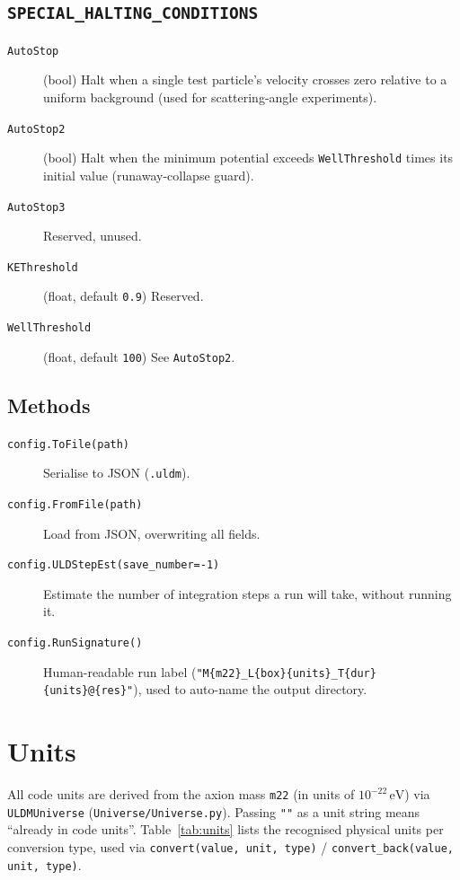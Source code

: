 \documentclass[11pt]{article}
\newcommand{\code}[1]{\texttt{#1}}
\newcommand{\field}[1]{\texttt{#1}}
\begin{document}
\subsection{\field{SPECIAL\_HALTING\_CONDITIONS}}
\begin{description}
  \item[\field{AutoStop}] (bool) Halt when a single test particle's velocity
    crosses zero relative to a uniform background (used for scattering-angle
    experiments).
  \item[\field{AutoStop2}] (bool) Halt when the minimum potential exceeds
    \field{WellThreshold} times its initial value (runaway-collapse guard).
  \item[\field{AutoStop3}] Reserved, unused.
  \item[\field{KEThreshold}] (float, default \code{0.9}) Reserved.
  \item[\field{WellThreshold}] (float, default \code{100}) See \field{AutoStop2}.
\end{description}

\subsection{Methods}
\begin{description}
  \item[\code{config.ToFile(path)}] Serialise to JSON (\code{.uldm}).
  \item[\code{config.FromFile(path)}] Load from JSON, overwriting all fields.
  \item[\code{config.ULDStepEst(save\_number=-1)}] Estimate the number of
    integration steps a run will take, without running it.
  \item[\code{config.RunSignature()}] Human-readable run label
    (\code{"M\{m22\}\_L\{box\}\{units\}\_T\{dur\}\{units\}@\{res\}"}), used to
    auto-name the output directory.
\end{description}

\section{Units}
\label{sec:units}

All code units are derived from the axion mass \field{m22} (in units of
$10^{-22}\,\mathrm{eV}$) via \code{ULDMUniverse} (\code{Universe/Universe.py}).
Passing \code{""} as a unit string means ``already in code units''.
Table~\ref{tab:units} lists the recognised physical units per conversion
type, used via \code{convert(value, unit, type)} /
\code{convert\_back(value, unit, type)}.
\end{document}
